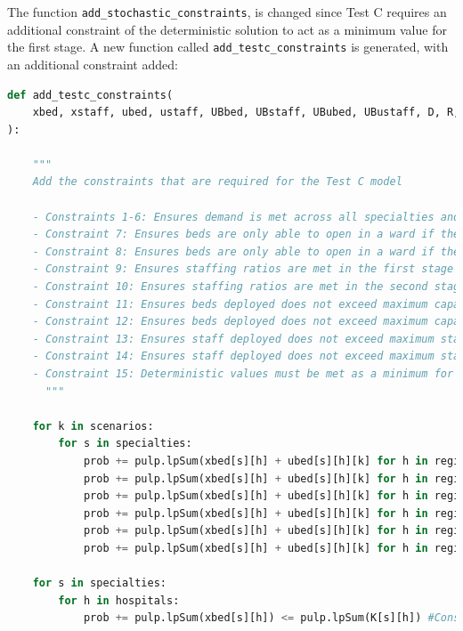\documentclass[../thesis.tex]{subfiles}
\begin{document}
The function \texttt{add\_stochastic\_constraints}, is changed since Test C requires an additional constraint of the deterministic solution to act as a minimum value for the first stage. A new function called \texttt{add\_testc\_constraints} is generated, with an additional constraint added:

\begin{lstlisting}[language=python]
def add_testc_constraints(
    xbed, xstaff, ubed, ustaff, UBbed, UBstaff, UBubed, UBustaff, D, R, K, prob, sh, shb, shk, srhk, sbhk, First_stage
):
    
    """
    Add the constraints that are required for the Test C model
    
    - Constraints 1-6: Ensures demand is met across all specialties and all regions
    - Constraint 7: Ensures beds are only able to open in a ward if the facilities are able to be opened - 1st stage
    - Constraint 8: Ensures beds are only able to open in a ward if the facilities are able to be opened - 2nd stage
    - Constraint 9: Ensures staffing ratios are met in the first stage
    - Constraint 10: Ensures staffing ratios are met in the second stage
    - Constraint 11: Ensures beds deployed does not exceed maximum capacity of hospital - 1st stage
    - Constraint 12: Ensures beds deployed does not exceed maximum capacity of hospital - 2nd stage
    - Constraint 13: Ensures staff deployed does not exceed maximum staffing resources - 1st stage
    - Constraint 14: Ensures staff deployed does not exceed maximum staffing resources - 2nd stage
    - Constraint 15: Deterministic values must be met as a minimum for the first stage
      """
        
    for k in scenarios:
        for s in specialties:
            prob += pulp.lpSum(xbed[s][h] + ubed[s][h][k] for h in region1) >= pulp.lpSum(D[s][0][k]) #Constraint 1
            prob += pulp.lpSum(xbed[s][h] + ubed[s][h][k] for h in region2) >= pulp.lpSum(D[s][1][k]) #Constraint 2
            prob += pulp.lpSum(xbed[s][h] + ubed[s][h][k] for h in region3) >= pulp.lpSum(D[s][2][k]) #Constraint 3
            prob += pulp.lpSum(xbed[s][h] + ubed[s][h][k] for h in region4) >= pulp.lpSum(D[s][3][k]) #Constraint 4
            prob += pulp.lpSum(xbed[s][h] + ubed[s][h][k] for h in region5) >= pulp.lpSum(D[s][4][k]) #Constraint 5
            prob += pulp.lpSum(xbed[s][h] + ubed[s][h][k] for h in region6) >= pulp.lpSum(D[s][5][k]) #Constraint 6 
                  
    for s in specialties:
        for h in hospitals:
            prob += pulp.lpSum(xbed[s][h]) <= pulp.lpSum(K[s][h]) #Constraint 7
            

\end{lstlisting}
\end{document}
